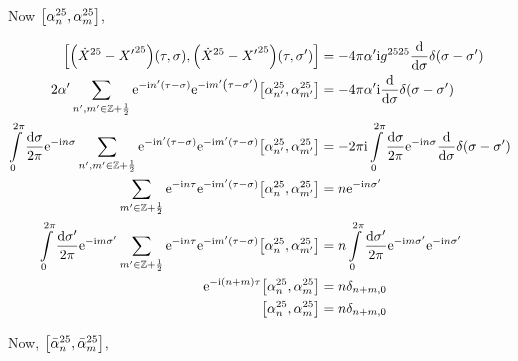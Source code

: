 Now $\comm{\alpha^{25}_n}{\alpha^{25}_m}$,

\begin{align*}
    \comm{\qty({\dot X}^{25}-{X'}^{25})\qty(\tau,\sigma)}{\qty({\dot X}^{25}-{X'}^{25})\qty(\tau,\sigma')}&=-4\pi\alpha'\im g^{2525}\dv{}{\sigma}\delta\qty(\sigma-\sigma')\\
    2\alpha'\sum\limits_{n',m'\in\mathbb Z+\frac12}\e^{-\im n'\qty(\tau-\sigma)}\e^{-\im m'\qty(\tau-\sigma')}\comm{\alpha^{25}_{n'}}{\alpha^{25}_{m'}}&=-4\pi\alpha'\im \dv{}{\sigma}\delta\qty(\sigma-\sigma')\\
    \int\limits_0^{2\pi}\frac{\dd{\sigma}}{2\pi}\e^{-\im n\sigma}\sum\limits_{n',m'\in\mathbb Z+\frac12}\e^{-\im n'\qty(\tau-\sigma)}\e^{-\im m'\qty(\tau-\sigma)}\comm{\alpha^{25}_{n'}}{\alpha^{25}_{m'}}&=-2\pi\im \int\limits_0^{2\pi}\frac{\dd{\sigma}}{2\pi}\e^{-\im n\sigma}\dv{}{\sigma}\delta\qty(\sigma-\sigma')\\
    \sum\limits_{m'\in\mathbb Z+\frac12}\e^{-\im n\tau}\e^{-\im m'\qty(\tau-\sigma)}\comm{\alpha^{25}_{n}}{\alpha^{25}_{m'}}&= n\e^{-\im n\sigma'}\\
    \int\limits_0^{2\pi}\frac{\dd{\sigma'}}{2\pi}\e^{-\im m\sigma'}\sum\limits_{m'\in\mathbb Z+\frac12}\e^{-\im n\tau}\e^{-\im m'\qty(\tau-\sigma)}\comm{\alpha^{25}_{n}}{\alpha^{25}_{m'}}&=n\int\limits_0^{2\pi}\frac{\dd{\sigma'}}{2\pi}\e^{-\im m\sigma'}\e^{-\im n\sigma'}\\
    \e^{-\im \qty(n+m)\tau}\comm{\alpha^{25}_{n}}{\alpha^{25}_{m}}&=n\delta_{n+m,0}\\
    \comm{\alpha^{25}_{n}}{\alpha^{25}_{m}}&=n\delta_{n+m,0}
\end{align*}

Now, $\comm{{\bar\alpha}^{25}_n}{{\bar\alpha}^{25}_m}$,


